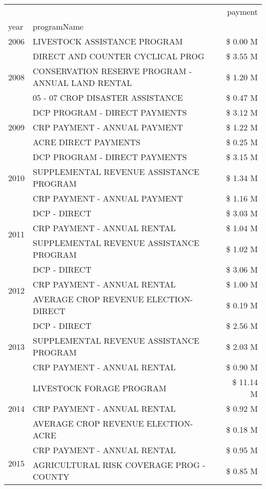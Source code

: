 \begin{tabular}{llr}
\toprule
 &  & payment \\
year & programName &  \\
\midrule
2006 & LIVESTOCK ASSISTANCE PROGRAM & \$ 0.00 M \\
\cline{1-3}
\multirow[t]{3}{*}{2008} & DIRECT AND COUNTER CYCLICAL PROG & \$ 3.55 M \\
 & CONSERVATION RESERVE PROGRAM - ANNUAL LAND RENTAL & \$ 1.20 M \\
 & 05 - 07 CROP DISASTER ASSISTANCE & \$ 0.47 M \\
\cline{1-3}
\multirow[t]{3}{*}{2009} & DCP PROGRAM - DIRECT PAYMENTS & \$ 3.12 M \\
 & CRP PAYMENT - ANNUAL PAYMENT & \$ 1.22 M \\
 & ACRE DIRECT PAYMENTS & \$ 0.25 M \\
\cline{1-3}
\multirow[t]{3}{*}{2010} & DCP PROGRAM - DIRECT PAYMENTS & \$ 3.15 M \\
 & SUPPLEMENTAL REVENUE ASSISTANCE PROGRAM & \$ 1.34 M \\
 & CRP PAYMENT - ANNUAL PAYMENT & \$ 1.16 M \\
\cline{1-3}
\multirow[t]{3}{*}{2011} & DCP - DIRECT & \$ 3.03 M \\
 & CRP PAYMENT - ANNUAL RENTAL & \$ 1.04 M \\
 & SUPPLEMENTAL REVENUE ASSISTANCE PROGRAM & \$ 1.02 M \\
\cline{1-3}
\multirow[t]{3}{*}{2012} & DCP - DIRECT & \$ 3.06 M \\
 & CRP PAYMENT - ANNUAL RENTAL & \$ 1.00 M \\
 & AVERAGE CROP REVENUE ELECTION-DIRECT & \$ 0.19 M \\
\cline{1-3}
\multirow[t]{3}{*}{2013} & DCP - DIRECT & \$ 2.56 M \\
 & SUPPLEMENTAL REVENUE ASSISTANCE PROGRAM & \$ 2.03 M \\
 & CRP PAYMENT - ANNUAL RENTAL & \$ 0.90 M \\
\cline{1-3}
\multirow[t]{3}{*}{2014} & LIVESTOCK FORAGE PROGRAM & \$ 11.14 M \\
 & CRP PAYMENT - ANNUAL RENTAL & \$ 0.92 M \\
 & AVERAGE CROP REVENUE ELECTION-ACRE & \$ 0.18 M \\
\cline{1-3}
\multirow[t]{3}{*}{2015} & CRP PAYMENT - ANNUAL RENTAL & \$ 0.95 M \\
 & AGRICULTURAL RISK COVERAGE PROG - COUNTY & \$ 0.85 M \\

\end{tabular}
